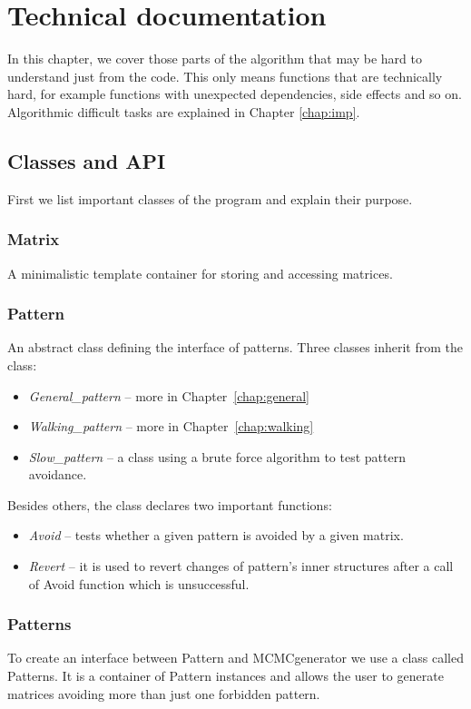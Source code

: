 \chapter{Technical documentation}
\label{chap:tdoc}
In this chapter, we cover those parts of the algorithm that may be hard to understand just from the code. This only means functions that are technically hard, for example functions with unexpected dependencies, side effects and so on. Algorithmic difficult tasks are explained in Chapter \ref{chap:imp}.

\section{Classes and API}
First we list important classes of the program and explain their purpose.

\subsection{Matrix}
A minimalistic template container for storing and accessing matrices.

\subsection{Pattern}
An abstract class defining the interface of patterns. Three classes inherit from the class:
\begin{itemize}
\item \emph{General\_pattern} -- more in Chapter~\ref{chap:general}
\item \emph{Walking\_pattern} -- more in Chapter~\ref{chap:walking}
\item \emph{Slow\_pattern} -- a class using a brute force algorithm to test pattern avoidance.
\end{itemize}
\label{patternapi}
Besides others, the class declares two important functions:
\begin{itemize}
\item \emph{Avoid} -- tests whether a given pattern is avoided by a given matrix.
\item \emph{Revert} -- it is used to revert changes of pattern's inner structures after a call of Avoid function which is unsuccessful.
\end{itemize}

\subsection{Patterns}
To create an interface between Pattern and MCMCgenerator we use a class called Patterns. It is a container of Pattern instances and allows the user to generate matrices avoiding more than just one forbidden pattern.

